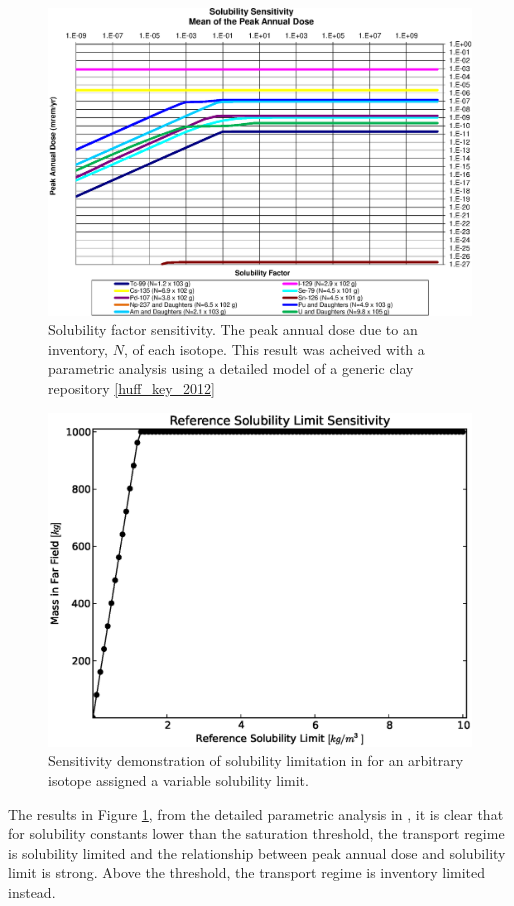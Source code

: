 \begin{figure}[ht]
\begin{center}
\includegraphics[width=0.7\linewidth]{./Solubility_Summary_SolFactor.eps}
\caption[Solubility factor sensitivity in GDSM Clay model]{Solubility factor sensitivity. The peak annual dose due to an inventory, $N$, of each isotope. This result was acheived with a parametric analysis using a detailed model of a generic clay repository \ref{huff_key_2012}}
\label{fig:SolSumFactor}
\end{center}
\end{figure}

\begin{figure}[ht]
\begin{center}
\includegraphics[width=0.7\linewidth]{./sol.eps}
\caption[Solubility Sensitivity in the Mixed Cell Model]{Sensitivity demonstration of solubility limitation in \Cyder for an arbitrary isotope assigned a variable solubility limit.}
\label{fig:sol_result}
\end{center}
\end{figure}


The results in Figure \ref{fig:SolSumFactor}, from the detailed parametric
analysis in \cite{huff_key_2012}, it is clear that for
solubility constants lower than the saturation threshold, the transport regime is solubility
limited and the relationship between peak annual dose and solubility limit is
strong.  Above the threshold, the transport regime is inventory limited
instead.

